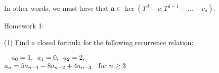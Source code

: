 \documentclass{book}
\newcommand{\myHS}{ \hspace{0.5em}}
\newcommand{\retTwo}{\hfill\bigbreak}
\newcommand{\mHeader}[1]{{
   \color{Black}%
   \fontsize{20}{18}\selectfont%
   #1\retTwo
}}
\begin{document}
In other words, we must have that $\bm{a} \in \ker(T^d - c_1T^{d-1} - \ldots - c_d)$.













\newpage

\mHeader{Homework 1:}

(1) Find a closed formula for the following recurrence relation:

{\centering 
$\begin{matrix}
   a_0 = 1,\myHS a_1 = 0,\myHS a_2 = 2,\\
   a_n = 5a_{n-1} - 8a_{n-2} + 4a_{n-3} & \text{for } n \geq 3
\end{matrix}$ \retTwo\par}
\end{document}
